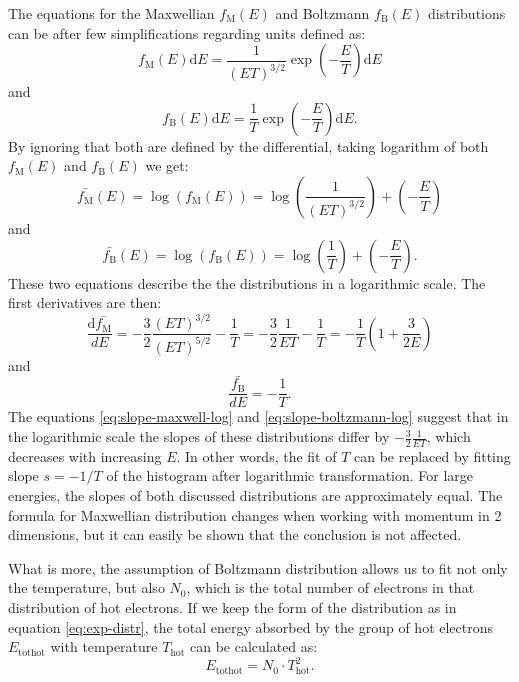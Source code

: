 The equations for the Maxwellian $f_\mathrm{M}(E)$ and Boltzmann $f_\mathrm{B}(E)$ distributions can be after few simplifications regarding units defined as:
\begin{equation}
	f_\mathrm{M}(E)\mathrm{d}E = \frac{1}{(ET)^{3/2}}\exp\left(-\frac{E}{T}\right)\mathrm{d}E
\end{equation}
and
\begin{equation}
	f_\mathrm{B}(E)\mathrm{d}E = \frac{1}{T}\exp\left(-\frac{E}{T}\right)\mathrm{d}E.
\end{equation}
By ignoring that both are defined by the differential, taking logarithm of both $f_\mathrm{M}(E)$ and $f_\mathrm{B}(E)$ we get:
\begin{equation}
	\bar{f_\mathrm{M}}(E) = \log\left(f_\mathrm{M}(E)\right) = \log\left(\frac{1}{(ET)^{3/2}}\right)+\left(-\frac{E}{T}\right)
\end{equation}
and
\begin{equation}
	\bar{f_\mathrm{B}}(E) = \log\left(f_\mathrm{B}(E)\right) = \log\left(\frac{1}{T}\right)+\left(-\frac{E}{T}\right).
\end{equation}
These two equations describe the the distributions in a logarithmic scale. The first derivatives are then:
\begin{equation}
	\label{eq:slope-maxwell-log}
	\frac{\mathrm{d}\bar{f_\mathrm{M}}}{dE} =-\frac{3}{2}\frac{(ET)^{3/2}}{(ET)^{5/2}}-\frac{1}{T} = -\frac{3}{2}\frac{1}{ET}-\frac{1}{T} = -\frac{1}{T}\left(1+\frac{3}{2E}\right)
\end{equation}
and
\begin{equation}
	\label{eq:slope-boltzmann-log}
	\frac{\bar{f_\mathrm{B}}}{dE} = -\frac{1}{T}.
\end{equation}
The equations \ref{eq:slope-maxwell-log} and \ref{eq:slope-boltzmann-log} suggest that in the logarithmic scale the slopes of these distributions differ by $-\frac{3}{2}\frac{1}{ET}$, which decreases with increasing $E$. In other words, the fit of $T$ can be replaced by fitting slope $s = -1/T$ of the histogram after logarithmic transformation. For large energies, the slopes of both discussed distributions are approximately equal. The formula for Maxwellian distribution changes when working with momentum in 2 dimensions, but it can easily be shown that the conclusion is not affected.

What is more, the assumption of Boltzmann distribution allows us to fit not only the temperature, but also $N_0$, which is the total number of electrons in that distribution of hot electrons. If we keep the form of the distribution as in equation \ref{eq:exp-distr}, the total energy absorbed by the group of hot electrons $E_{\mathrm{tothot}}$ with temperature $T_\mathrm{hot}$ can be calculated as:
\begin{equation}
	E_{\mathrm{tothot}} = N_0\cdot T_\mathrm{hot}^2.
\end{equation}


